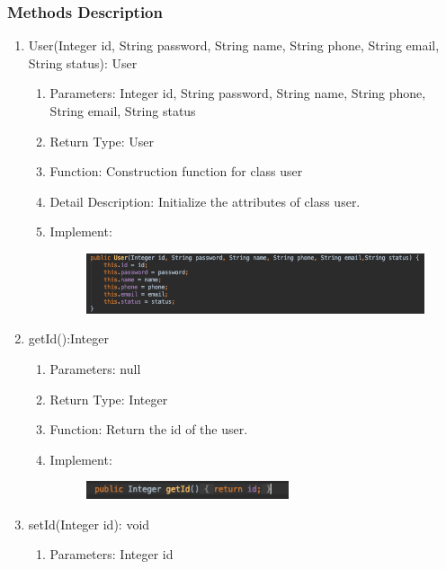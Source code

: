 \documentclass[16pt]{scrreprt}
\begin{document}
\subsubsection{Methods Description}
\begin{enumerate}
    \item User(Integer id, String password, String name, String phone, String email, String status): User
    \begin{enumerate}
        \item Parameters: Integer id, String password, String name, String phone, String email, String status
        \item Return Type: User
        \item Function: Construction function for class user
        \item Detail Description: Initialize the attributes of class user.
        \item Implement:
        \begin{figure}[H]
    \centering
    \includegraphics[width=1.\textwidth]{diagrams/userfunc.png}\\
\end{figure}
    \end{enumerate}
    \item getId():Integer 
    \begin{enumerate}
        \item Parameters: null
        \item Return Type: Integer
        \item Function: Return the id of the user.
        \item Implement:
        \begin{figure}[H]
    \centering
    \includegraphics[width=0.6\textwidth]{diagrams/getid.png}\\
\end{figure}
    \end{enumerate}
    \item setId(Integer id): void
    \begin{enumerate}
        \item Parameters: Integer id

\end{enumerate}
\end{enumerate}
\end{document}
